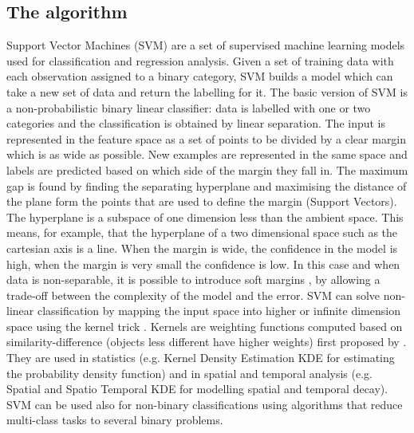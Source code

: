 \documentclass [a4paper,12 pt]{article}
\begin{document}
\subsection{The algorithm}
Support Vector Machines (SVM) are a set of supervised machine learning models used for classification and regression analysis. Given a set of training data with each observation assigned to a binary category, SVM builds a model which can take a new set of data and return the labelling for it. The basic version of SVM is a non-probabilistic binary linear classifier: data is labelled with one or two categories and the classification is obtained by linear separation. The input is represented in the feature space as a set of points to be divided by a clear margin which is as wide as possible. New examples are represented in the same space and labels are predicted based on which side of the margin they fall in. The maximum gap is found by finding the separating hyperplane and maximising the distance of the plane form the points that are used to define the margin (Support Vectors). The hyperplane is a subspace of one dimension less than the ambient space. This means, for example, that the hyperplane of a two dimensional space such as the cartesian axis is a line. When the margin is wide, the confidence in the model is high, when the margin is very small the confidence is low. In this case and when data is non-separable, it is possible to introduce soft margins \citep{cortes1995support}, by allowing a trade-off between the complexity of the model and the error. SVM can solve non-linear classification by mapping the input space into higher or infinite dimension space using the kernel trick \citep{boser1992training}. Kernels are weighting functions computed based on similarity-difference (objects less different have higher weights) first proposed by \cite{aizerman1964theoretical}. They are used in statistics (e.g. Kernel Density Estimation KDE for estimating the probability density function) and in spatial and temporal analysis (e.g. Spatial and Spatio Temporal KDE for modelling spatial and temporal decay). SVM can be used also for non-binary classifications using algorithms that reduce multi-class tasks to several binary problems. \\
\end{document}
